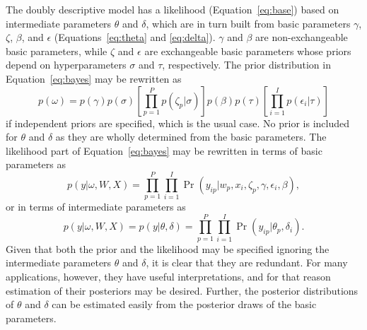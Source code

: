 \documentclass[12pt, letterpaper]{article}
\begin{document}
The doubly descriptive model has a likelihood (Equation~\ref{eq:base}) based on intermediate parameters $\theta$ and $\delta$, which are in turn built from basic parameters $\gamma$, $\zeta$, $\beta$, and $\epsilon$ (Equations~\ref{eq:theta} and \ref{eq:delta}). $\gamma$ and $\beta$ are non-exchangeable basic parameters, while $\zeta$ and $\epsilon$ are exchangeable basic parameters whose priors depend on hyperparameters $\sigma$ and $\tau$, respectively.
The prior distribution in Equation~\ref{eq:bayes} may be rewritten as
\begin{equation} \label{eq:prior}
	p(\omega) =
	p(\gamma) p(\sigma)
	\left [
		\prod_{p=1}^P p(\zeta_p | \sigma)
	\right ]
	p(\beta) p(\tau)
	\left [
		\prod_{i=1}^I p(\epsilon_i | \tau)
	\right ]
\end{equation}
if independent priors are specified, which is the usual case. No prior is included for $\theta$ and $\delta$ as they are wholly determined from the basic parameters.
The likelihood part of Equation~\ref{eq:bayes} may be rewritten in terms of basic parameters as
\begin{equation} \label{eq:bayes-likelihood-alt}
	p(y | \omega, W, X) =
	\prod_{p=1}^P \prod_{i=1}^I
	\Pr(y_{ip} | w_p, x_i, \zeta_p, \gamma, \epsilon_i, \beta)
,\end{equation}
or in terms of intermediate parameters as
\begin{equation} \label{eq:bayes-likelihood}
	p(y | \omega, W, X) =
	p(y | \theta, \delta) =
	\prod_{p=1}^P \prod_{i=1}^I \Pr(y_{ip} | \theta_p, \delta_i)
.\end{equation}
Given that both the prior and the likelihood may be specified ignoring the intermediate parameters $\theta$ and $\delta$, it is clear that they are redundant. For many applications, however, they have useful interpretations, and for that reason estimation of their posteriors may be desired. Further, the posterior distributions of $\theta$ and $\delta$ can be estimated easily from the posterior draws of the basic parameters.
\end{document}
